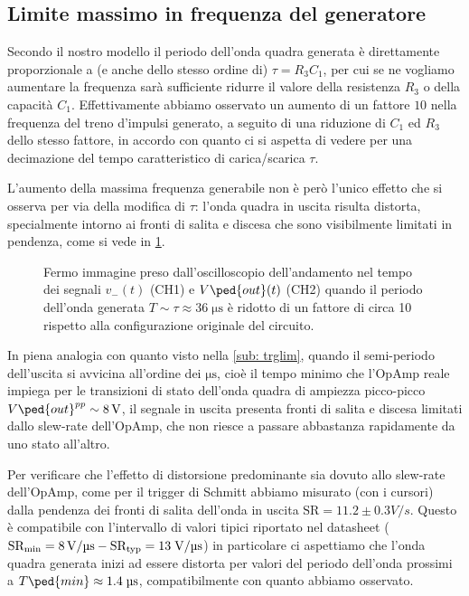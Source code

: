 \documentclass[10pt, a4paper, italian]{article}
\begin{document}
\subsection{Limite massimo in frequenza del generatore}
Secondo il nostro modello il periodo dell'onda quadra generata è direttamente
proporzionale a (e anche dello stesso ordine di) $\tau = R_3 C_1$, per cui
se ne vogliamo aumentare la frequenza sarà sufficiente ridurre il valore
della resistenza $R_3$ o della capacità $C_1$. Effettivamente abbiamo osservato
un aumento di un fattore $10$ nella frequenza del treno d'impulsi generato,
a seguito di una riduzione di $C_1$ ed $R_3$ dello stesso fattore, in accordo
con quanto ci si aspetta di vedere per una decimazione del tempo caratteristico
di carica/scarica $\tau$.

L'aumento della massima frequenza generabile non è però l'unico effetto che
si osserva per via della modifica di $\tau$: l'onda quadra in uscita risulta
distorta, specialmente intorno ai fronti di salita e discesa che sono
visibilmente limitati in pendenza, come si vede in \cref{fig: astable1nF}.
\begin{figure}[htbp]
	\centering
	\caption{Fermo immagine preso dall'oscilloscopio dell'andamento nel tempo dei
	segnali $v_- (t)$ (CH1) e $V\ped{out} (t)$ (CH2) quando il periodo dell'onda
	generata $T \sim \tau \approx 36 \; \si{\micro\s}$ è ridotto di un fattore di
	circa 10 rispetto alla configurazione originale del circuito.
	\label{fig: astable1nF}}
\end{figure}

In piena analogia con quanto visto nella \cref{sub: trglim}, quando il
semi-periodo dell'uscita si avvicina all'ordine dei $\si{\micro\s}$, cioè il
tempo minimo che l'OpAmp reale impiega per le transizioni di stato dell'onda
quadra di ampiezza picco-picco $V\ped{out}^{pp} \sim \SI{8}{\V}$, il segnale
in uscita presenta fronti di salita e discesa limitati dallo slew-rate
dell'OpAmp, che non riesce a passare abbastanza rapidamente da uno stato
all'altro.

Per verificare che l'effetto di distorsione predominante sia dovuto allo
slew-rate dell'OpAmp, come per il trigger di Schmitt abbiamo misurato (con
i cursori) dalla pendenza dei fronti di salita dell'onda in uscita
$\mathrm{SR} = 11.2 \pm 0.3 \si{V/s}$. Questo è compatibile con l'intervallo
di valori tipici riportato nel datasheet
($\rm SR_{min} = \SI{8}{\V/\micro\s} - SR_{typ} = 13 \; \si{\V/\micro\s}$)
in particolare ci aspettiamo che l'onda quadra generata inizi ad essere
distorta per valori del periodo dell'onda prossimi a
$T\ped{min} \approx 1.4 \; \si{\micro\s}$, compatibilmente con quanto abbiamo
osservato.
\end{document}

